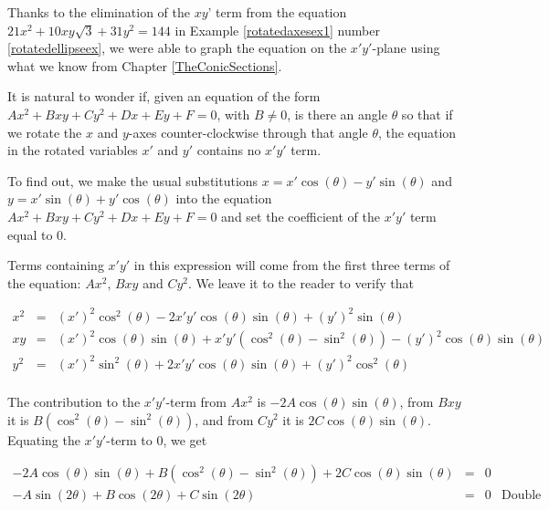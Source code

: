 \documentclass{ximera}
\begin{document}
Thanks to the elimination of  the $xy$' term from the equation $21x^2+10xy\sqrt{3}+31y^2=144$ in  Example \ref{rotatedaxesex1} number \ref{rotatedellipseex}, we   were able to graph the equation on the $x'y'$-plane using what we know from Chapter \ref{TheConicSections}. 

\smallskip
	
 It is natural to wonder if, given an equation of the form $Ax^2 + Bxy +Cy^2 + Dx + Ey + F = 0$, with $B \neq 0$, is there an angle $\theta$ so that if we rotate the $x$ and $y$-axes counter-clockwise through that angle $\theta$, the equation in the rotated  variables $x'$ and $y'$ contains no $x'y'$ term.
 
 \smallskip
 
  To find out, we make the usual substitutions  $x = x' \cos(\theta) - y' \sin(\theta)$ and  $y =  x'\sin(\theta) + y'\cos(\theta)$ into the equation $Ax^2 + Bxy +Cy^2 + Dx + Ey + F = 0$ and set the coefficient of the $x'y'$ term equal to $0$.  
  
  \smallskip
  
  Terms containing $x'y'$ in this expression will come from the first three terms of the equation: $Ax^2$, $Bxy$ and $Cy^2$.  We leave it to the reader to verify that 

\[ \begin{array}{rcl}



x^2 & = &(x')^2 \cos^{2}(\theta) - 2x'y'\cos(\theta) \sin(\theta) + (y')^2 \sin(\theta) \\ [3pt]


xy & = &  (x')^2\cos(\theta) \sin(\theta)+ x'y' \left(\cos^{2}(\theta)-\sin^2(\theta)\right)-(y')^2\cos(\theta)\sin(\theta) \\ [3pt]


y^2 & = & (x')^2 \sin^{2}(\theta) +2x'y' \cos(\theta) \sin(\theta) +(y')^2 \cos^{2}(\theta) \\

\end{array} \]

The contribution to the $x'y'$-term from $Ax^2$ is $-2A\cos(\theta) \sin(\theta)$, from $Bxy$ it is $B \left(\cos^{2}(\theta)-\sin^2(\theta)\right)$, and from $Cy^2$ it is $2C \cos(\theta) \sin(\theta)$.  Equating the $x'y'$-term to $0$, we get

\[ \begin{array}{rcll}

-2A\cos(\theta) \sin(\theta) + B \left(\cos^{2}(\theta)-\sin^2(\theta)\right) + 2C \cos(\theta) \sin(\theta) & = & 0 & \\ [3pt]
-A \sin(2\theta) + B \cos(2\theta) + C \sin(2\theta) & = & 0 & \text{Double Angle Identities} \\ [3pt]
\end{array} \]
\end{document}
